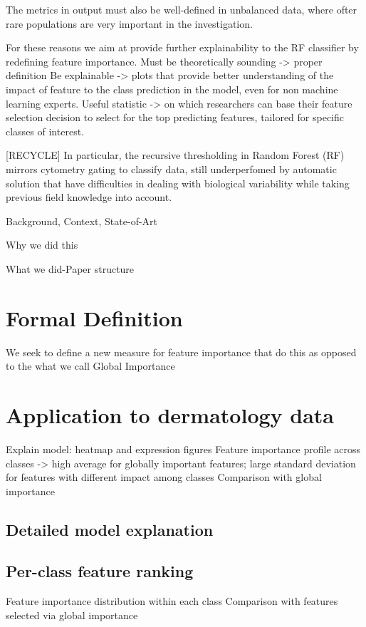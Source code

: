 \documentclass[12pt,a4paper]{article}
\theoremstyle{definition}
\theoremstyle{plain}
\theoremstyle{remark}
\begin{document}
The metrics in output must also be well-defined in unbalanced data, where ofter rare populations are very important in the investigation.

For these reasons we aim at provide further explainability to the RF classifier by redefining feature importance.
Must be theoretically sounding -> proper definition
Be explainable -> plots that provide better understanding of the impact of feature to the class prediction in the model, even for non machine learning experts.
Useful statistic -> on which researchers can base their feature selection decision to select for the top predicting features, tailored for specific classes of interest.


[RECYCLE] In particular, the recursive thresholding in Random Forest (RF) mirrors cytometry gating to classify data, still underperfomed by automatic solution that have difficulties in dealing with biological variability while taking previous field knowledge into account.

Background, Context, State-of-Art

Why we did this

What we did-Paper structure


\section{Formal Definition}\label{sec:conv_stat}
We seek to define a new measure for feature importance
that do this
as opposed to the what we call Global Importance

\section{Application to dermatology data}\label{sec:matrix_rank}

Explain model: heatmap and expression figures
Feature importance profile across classes -> high average for globally important features; large standard deviation for features with different impact among classes
Comparison with global importance

\subsection{Detailed model explanation}\label{subsec:explanability}

\subsection{Per-class feature ranking}\label{subsec:feature_selection}
Feature importance distribution within each class
Comparison with features selected via global importance
\end{document}
